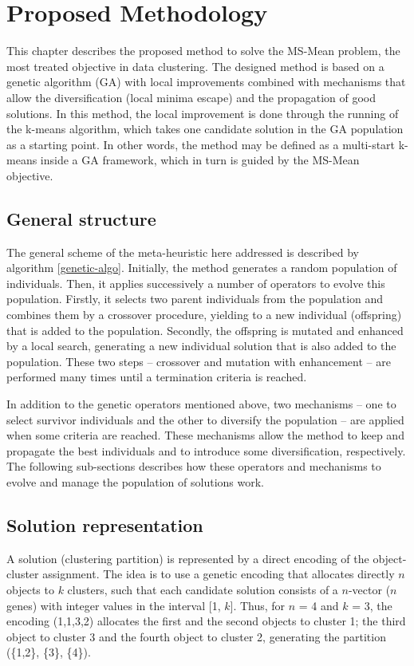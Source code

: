 \chapter{Proposed Methodology}
\label{chap:methodology}
This chapter describes the proposed method to solve the MS-Mean problem, the most treated objective in data clustering. The designed method is based on a genetic algorithm (GA) with local improvements combined with mechanisms that allow the diversification (local minima escape) and the propagation of good solutions. In this method, the local improvement is done through the running of the k-means algorithm, which takes one candidate solution in the GA population as a starting point. In other words, the method may be defined as a multi-start k-means inside a GA framework, which in turn is guided by the MS-Mean objective.

\section{General structure}
The general scheme of the meta-heuristic here addressed is described by algorithm \ref{genetic-algo}. Initially, the method generates a random population of individuals. Then, it applies successively a number of operators to evolve this population. Firstly, it selects two parent individuals from the population and combines them by a crossover procedure, yielding to a new individual (offspring) that is added to the population. Secondly, the offspring is mutated and enhanced by a local search, generating a new individual solution that is also added to the population. These two steps -- crossover and mutation with enhancement -- are performed many times until a termination criteria is reached.

In addition to the genetic operators mentioned above, two mechanisms -- one to select survivor individuals and the other to diversify the population -- are applied when some criteria are reached. These mechanisms allow the method to keep and propagate the best individuals and to introduce some diversification, respectively. The following sub-sections describes how these operators and mechanisms to evolve and manage the population of solutions work.

\section{Solution representation}
A solution (clustering partition) is represented by a direct encoding of the object-cluster assignment. The idea is to use a genetic encoding that allocates directly $n$ objects to $k$ clusters, such that each candidate solution consists of a $n$-vector ($n$ genes) with integer values in the interval [1, $k$]. Thus, for $n$ = 4 and $k$ = 3, the encoding (1,1,3,2) allocates the first and the second objects to cluster 1; the third object to cluster 3 and the fourth object to cluster 2, generating the partition (\{1,2\}, \{3\}, \{4\}).


